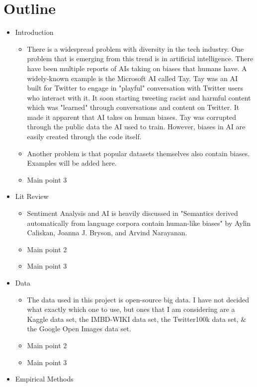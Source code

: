 \documentclass[12pt,english]{article}
\begin{document}
\section{Outline}
\begin{itemize}
\item Introduction
    \begin{itemize}
    \item There is a widespread problem with diversity in the tech industry. One problem that is emerging from this trend is in artificial intelligence. There have been multiple reports of AIs taking on biases that humans have. A widely-known example is the Microsoft AI called Tay. Tay was an AI built for Twitter to engage in "playful" conversation with Twitter users who interact with it. It soon starting tweeting racist and harmful content which was "learned" through conversations and content on Twitter. It made it apparent that AI takes on human biases. Tay was corrupted through the public data the AI used to train. However, biases in AI are easily created through the code itself.
    \item Another problem is that popular datasets themselves also contain biases. Examples will be added here.
    \item Main point 3
    \end{itemize}
\item Lit Review
    \begin{itemize}
    \item Sentiment Analysis and AI is heavily discussed in "Semantics derived automatically from language corpora contain human-like biases" by Aylin Caliskan, Joanna J. Bryson, and Arvind Narayanan.
    \item Main point 2
    \item Main point 3
    \end{itemize}
\item Data
    \begin{itemize}
    \item The data used in this project is open-source big data. I have not decided what exactly which one to use, but ones that I am considering are a Kaggle data set, the IMBD-WIKI data set, the Twitter100k data set, & the Google Open Images data set.
    \item Main point 2
    \item Main point 3
    \end{itemize}
\item Empirical Methods
    \begin{itemize}

\end{itemize}
\end{itemize}
\end{document}
